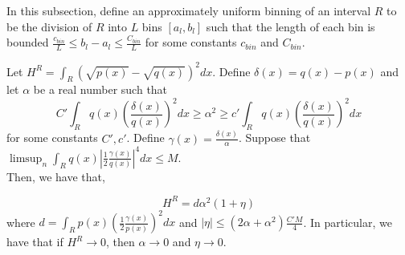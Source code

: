 In this subsection, define an approximately uniform binning of an interval $R$ to be the division of $R$ into $L$ bins $[a_l, b_l]$ such that the length of each bin is bounded $\frac{c_{bin}}{L} \leq b_l - a_l \leq \frac{C_{bin}}{L}$ for some constants $c_{bin}$ and $C_{bin}$. 



\begin{proposition}
\label{prop:continuous_hellinger_chi_square}
Let $H^R = \int_R (\sqrt{p(x)} - \sqrt{q(x)})^2 dx$. Define $\delta(x) = q(x) - p(x)$ and let $\alpha$ be a real number such that 
\[
C' \int_R q(x) \left( \frac{\delta(x)}{q(x)} \right)^2 dx \geq \alpha^2 \geq c' \int_R q(x) \left( \frac{\delta(x)}{q(x)} \right)^2 dx
\]
 for some constants $C', c'$. Define $\gamma(x) = \frac{\delta(x)}{\alpha}$. Suppose that $\limsup_n \int_R q(x) \left| \frac{1}{2} \frac{\gamma(x)}{q(x)} \right|^4 dx \leq M$.\\
Then, we have that, 


\[
H^R = d \alpha^2 ( 1 + \eta )
\]
where $d = \int_R p(x) \left( \frac{1}{2} \frac{\gamma(x)}{p(x)} \right)^2 dx$ and $|\eta| \leq (2\alpha + \alpha^2) \frac{C'M}{4}$. In particular, we have that if $H^R \rightarrow 0$, then $\alpha \rightarrow 0$ and $\eta \rightarrow 0$. 

\end{proposition}


